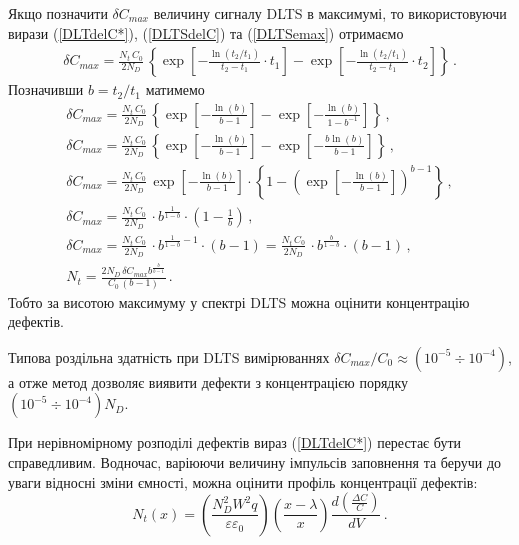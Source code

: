Якщо позначити $\delta C_{max}$ величину сигналу DLTS в максимумі,
то використовуючи вирази (\ref{DLTdelC*}), (\ref{DLTSdelC}) та (\ref{DLTSemax}) отримаємо
\begin{gather*}
  \delta C_{max}=\frac{N_t\,C_0}{2N_D}\,\left\{\exp\left[-\frac{\ln\left(t_2/t_1\right)}{t_2-t_1}\cdot t_1\right]
     -\exp\left[-\frac{\ln\left(t_2/t_1\right)}{t_2-t_1}\cdot t_2\right]\right\}\,.\nonumber
\end{gather*}
Позначивши $b=t_2/t_1$ матимемо
\begin{gather}
  \delta C_{max}=\frac{N_t\,C_0}{2N_D}\,\left\{\exp\left[-\frac{\ln\left(b\right)}{b-1}\right]
     -\exp\left[-\frac{\ln\left(b\right)}{1-b^{-1}} \right]\right\}\,,\nonumber\\
  \delta C_{max}=\frac{N_t\,C_0}{2N_D}\,\left\{\exp\left[-\frac{\ln\left(b\right)}{b-1}\right]
     -\exp\left[-\frac{b\ln\left(b\right)}{b-1} \right]\right\}\,,\nonumber\\
  \delta C_{max}=\frac{N_t\,C_0}{2N_D}\,\exp\left[-\frac{\ln\left(b\right)}{b-1}\right]\cdot
  \left\{1 -\left(\exp\left[-\frac{\ln\left(b\right)}{b-1} \right]\right)^{b-1}\right\}\,,\nonumber  \\
  \delta C_{max}=\frac{N_t\,C_0}{2N_D}\,\cdot b^{\frac{1}{1-b}}\cdot
  \left(1-\frac{1}{b}\right)\,,\nonumber     \\
    \delta C_{max}=\frac{N_t\,C_0}{2N_D}\,\cdot b^{\frac{1}{1-b}-1}\cdot \left(b-1\right)
                  =\frac{N_t\,C_0}{2N_D}\,\cdot b^{\frac{b}{1-b}}\cdot \left(b-1\right)\,,\nonumber \\
    N_t=\frac{2N_D\,\delta C_{max}b^{\frac{b}{b-1}}}{C_0\,(b-1)}\,.
\end{gather}
Тобто за висотою максимуму у спектрі DLTS можна  оцінити концентрацію дефектів.

Типова роздільна здатність при DLTS вимірюваннях $\delta C_{max}/C_0\approx(10^{-5}\div 10^{-4})$,
а отже метод дозволяє виявити дефекти з концентрацією порядку $(10^{-5}\div 10^{-4})N_D$.


При нерівномірному розподілі дефектів вираз (\ref{DLTdelC*}) перестає бути справедливим.
Водночас, варіюючи величину імпульсів заповнення та беручи до уваги відносні зміни ємності,
можна оцінити профіль концентрації дефектів:
\begin{equation}
\label{DLTSNt}
N_t(x)=\left(\frac{N_D^2W^2q}{\varepsilon\varepsilon_0}\right)\left(\frac{x-\lambda}{x}\right)\frac{d\left(\frac{\Delta C}{C}\right)}{dV}\,.
\end{equation}

